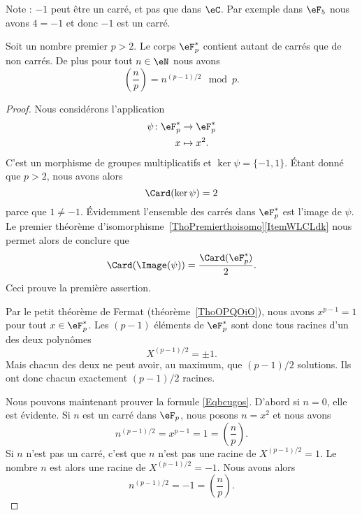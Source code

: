 Note : \( -1\) peut être un carré, et pas que dans \( \eC\). Par exemple dans \( \eF_5\) nous avons \( 4=-1\) et donc \( -1\) est un carré.

\begin{proposition} \label{PropcGsJjk}
	Soit un nombre premier \( p>2\). Le corps \( \eF_p^*\) contient autant de carrés que de non carrés. De plus pour tout \( n\in \eN\) nous avons
	\begin{equation}    \label{Eqbcugos}
		\left(\frac{n}{p}\right)=n^{(p-1)/2}\mod p.
	\end{equation}
\end{proposition}

\begin{proof}
	Nous considérons l'application
	\begin{equation}
		\begin{aligned}
			\psi\colon \eF^*_p & \to \eF^*_p  \\
			x                  & \mapsto x^2.
		\end{aligned}
	\end{equation}
	C'est un morphisme de groupes multiplicatifs et \( \ker\psi=\{ -1,1 \}\). Étant donné que \( p>2\), nous avons alors
	\begin{equation}
		\Card(\ker\psi)=2
	\end{equation}
	parce que \( 1\neq -1\). Évidemment l'ensemble des carrés dans \( \eF^*_p\) est l'image de \( \psi\). Le premier théorème d'isomorphisme~\ref{ThoPremierthoisomo}\ref{ItemWLCLdk} nous permet alors de conclure que
	\begin{equation}
		\Card(\Image(\psi))=\frac{ \Card(\eF^*_p) }{2}.
	\end{equation}
	Ceci prouve la première assertion.

	Par le petit théorème de Fermat (théorème~\ref{ThoOPQOiO}), nous avons \( x^{p-1}=1\) pour tout \( x\in \eF^*_p\). Les \( (p-1)\) éléments de \( \eF^*_p\) sont donc tous racines d'un des deux polynômes
	\begin{equation}
		X^{(p-1)/2}=\pm 1.
	\end{equation}
	Mais chacun des deux ne peut avoir, au maximum, que \( (p-1)/2\) solutions. Ils ont donc chacun exactement \( (p-1)/2\) racines.

	Nous pouvons maintenant prouver la formule \eqref{Eqbcugos}. D'abord si \( n=0\), elle est évidente. Si \( n\) est un carré dans \( \eF_p\), nous posons \( n=x^2\) et nous avons
	\begin{equation}
		n^{(p-1)/2}=x^{p-1}=1=\left(\frac{n}{p}\right).
	\end{equation}
	Si \( n\) n'est pas un carré, c'est que \( n\) n'est pas une racine de \( X^{(p-1)/2}=1\). Le nombre \( n\) est alors une racine de \( X^{(p-1)/2}=-1\). Nous avons alors
	\begin{equation}
		n^{(p-1)/2}=-1=\left(\frac{n}{p}\right).
	\end{equation}
\end{proof}

